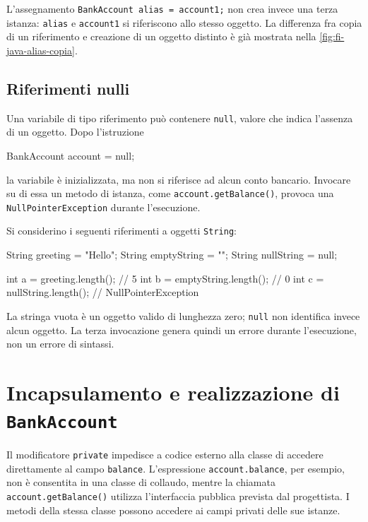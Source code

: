 L'assegnamento \texttt{BankAccount alias = account1;}
non crea invece una terza istanza: \texttt{alias} e
\texttt{account1} si riferiscono allo stesso oggetto.
La differenza fra copia di un riferimento e creazione
di un oggetto distinto è già mostrata nella
\cref{fig:fi-java-alias-copia}.

\subsection{Riferimenti nulli}
\label{sec:fi-java-classi-null}

Una variabile di tipo riferimento può contenere
\texttt{null}, valore che indica l'assenza di un
oggetto. Dopo l'istruzione

\begin{unipdcode}[language=Java]
BankAccount account = null;
\end{unipdcode}

la variabile è inizializzata, ma non si riferisce ad
alcun conto bancario. Invocare su di essa un metodo
di istanza, come \texttt{account.getBalance()}, provoca
una \texttt{NullPointerException} durante l'esecuzione.

\clearpage

\begin{example}
Si considerino i seguenti riferimenti a oggetti
\texttt{String}:

\begin{unipdcode}[language=Java]
String greeting = "Hello";
String emptyString = "";
String nullString = null;

int a = greeting.length();    // 5
int b = emptyString.length(); // 0
int c = nullString.length();  // NullPointerException
\end{unipdcode}

La stringa vuota è un oggetto valido di lunghezza zero;
\texttt{null} non identifica invece alcun oggetto. La
terza invocazione genera quindi un errore durante
l'esecuzione, non un errore di sintassi.
\end{example}

\section{Incapsulamento e realizzazione di \texttt{BankAccount}}
\label{sec:fi-java-classi-incapsulamento}

Il modificatore \texttt{private} impedisce a codice
esterno alla classe di accedere direttamente al campo
\texttt{balance}. L'espressione \texttt{account.balance},
per esempio, non è consentita in una classe di collaudo,
mentre la chiamata \texttt{account.getBalance()} utilizza
l'interfaccia pubblica prevista dal progettista. I metodi
della stessa classe possono accedere ai campi privati
delle sue istanze.

